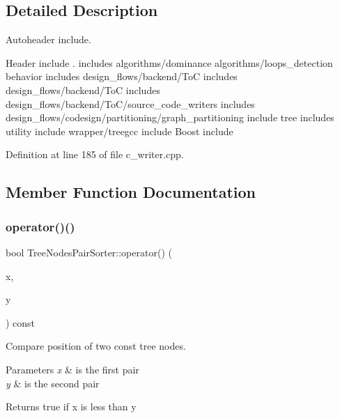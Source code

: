 \subsection{Detailed Description}
Autoheader include. 

Header include . includes algorithms/dominance algorithms/loops\+\_\+detection behavior includes design\+\_\+flows/backend/\+ToC includes design\+\_\+flows/backend/\+ToC includes design\+\_\+flows/backend/\+To\+C/source\+\_\+code\+\_\+writers includes design\+\_\+flows/codesign/partitioning/graph\+\_\+partitioning include tree includes utility include wrapper/treegcc include Boost include 

Definition at line 185 of file c\+\_\+writer.\+cpp.



\subsection{Member Function Documentation}
\mbox{\label{classTreeNodesPairSorter_a7842f04c3f3690237eb1d37b67ed8904}} 
\subsubsection{\texorpdfstring{operator()()}{operator()()}}
{\footnotesize\ttfamily bool Tree\+Nodes\+Pair\+Sorter\+::operator() (\begin{DoxyParamCaption}\item[{const std\+::pair$<$ \hyperlink{tree__node_8hpp_a6ee377554d1c4871ad66a337eaa67fd5}{tree\+\_\+node\+Ref}, \hyperlink{tree__node_8hpp_a6ee377554d1c4871ad66a337eaa67fd5}{tree\+\_\+node\+Ref} $>$ \&}]{x,  }\item[{const std\+::pair$<$ \hyperlink{tree__node_8hpp_a6ee377554d1c4871ad66a337eaa67fd5}{tree\+\_\+node\+Ref}, \hyperlink{tree__node_8hpp_a6ee377554d1c4871ad66a337eaa67fd5}{tree\+\_\+node\+Ref} $>$ \&}]{y }\end{DoxyParamCaption}) const\hspace{0.3cm}{\ttfamily [inline]}}



Compare position of two const tree nodes. 


\begin{DoxyParams}{Parameters}
{\em x} & is the first pair \\
\hline
{\em y} & is the second pair \\
\hline
\end{DoxyParams}
\begin{DoxyReturn}{Returns}
true if x is less than y 
\end{DoxyReturn}


